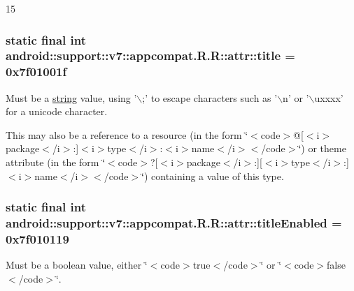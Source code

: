 15\hypertarget{classandroid_1_1support_1_1v7_1_1appcompat_1_1_r_1_1attr_fce526573a83130ba5da509c3d2bdb7b}{
\subsubsection[{title}]{\setlength{\rightskip}{0pt plus 5cm}static final int android::support::v7::appcompat.R.R::attr::title = 0x7f01001f}}
\label{classandroid_1_1support_1_1v7_1_1appcompat_1_1_r_1_1attr_fce526573a83130ba5da509c3d2bdb7b}


Must be a \hyperlink{classandroid_1_1support_1_1v7_1_1appcompat_1_1_r_1_1string}{string} value, using '$\backslash$;' to escape characters such as '$\backslash$n' or '$\backslash$uxxxx' for a unicode character. 

This may also be a reference to a resource (in the form \char`\"{}$<$code$>$@\mbox{[}$<$i$>$package$<$/i$>$:\mbox{]}$<$i$>$type$<$/i$>$:$<$i$>$name$<$/i$>$$<$/code$>$\char`\"{}) or theme attribute (in the form \char`\"{}$<$code$>$?\mbox{[}$<$i$>$package$<$/i$>$:\mbox{]}\mbox{[}$<$i$>$type$<$/i$>$:\mbox{]}$<$i$>$name$<$/i$>$$<$/code$>$\char`\"{}) containing a value of this type. \hypertarget{classandroid_1_1support_1_1v7_1_1appcompat_1_1_r_1_1attr_fea3dd32d41218df5a2f85598ddfba61}{
\subsubsection[{titleEnabled}]{\setlength{\rightskip}{0pt plus 5cm}static final int android::support::v7::appcompat.R.R::attr::titleEnabled = 0x7f010119}}
\label{classandroid_1_1support_1_1v7_1_1appcompat_1_1_r_1_1attr_fea3dd32d41218df5a2f85598ddfba61}


Must be a boolean value, either \char`\"{}$<$code$>$true$<$/code$>$\char`\"{} or \char`\"{}$<$code$>$false$<$/code$>$\char`\"{}. 


